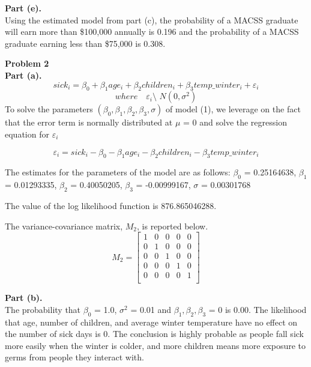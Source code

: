 \documentclass[letterpaper,12pt]{article}
\theoremstyle{definition}
\begin{document}
\textbf{Part (e).} \\
\flushleft Using the estimated model from part (c), the probability of a MACSS graduate will earn more than \$100,000 annually is 0.196 and the probability of a MACSS graduate earning less than \$75,000 is 0.308. 

\flushleft


\newpage
\noindent\textbf{Problem 2}\\
\textbf{Part (a).} \\
\flushleft 
\begin{equation}
sick_{i}=\beta_0+\beta_1age_{i}+\beta_2children_i+\beta_3temp\_winter_{i}+\varepsilon_{i}
\end{equation}
\begin{equation}
where\quad \varepsilon_i \texttt{\char`\~} N(0, \sigma^2)\nonumber
\end{equation}
To solve the parameters $(\beta_0, \beta_1, \beta_2, \beta_3, \sigma)$ of model (1), we leverage on the fact that the error term is normally distributed at $\mu$ = 0 and solve the regression equation for $\varepsilon_i$

\begin{equation}
\varepsilon_{i}= sick_i - \beta_0 - \beta_1age_{i}-\beta_2children_i-\beta_3temp\_winter_{i}
\end{equation}

The estimates for the parameters of the model are as follows: 
$\beta_0$ = 0.25164638, $\beta_1$ = 0.01293335, $\beta_2$ = 0.40050205, $\beta_3$ = -0.00999167,  $\sigma$ = 0.00301768

\flushleft 
The value of the log likelihood function is 876.865046288.

\flushleft 
The variance-covariance matrix, $M_2$, is reported below. 
\[
M_2 =
  \begin{bmatrix}
1 &  0&  0&  0&  0\\
0 &  1&  0&  0&  0\\
0 &  0&  1&  0&  0\\
0 &  0&  0&  1&  0\\
0 &  0&  0&  0&  1\\
\end{bmatrix}
\]


\textbf{Part (b).} \\
\flushleft 
The probability that $\beta_0$ = 1.0, $\sigma^2$ = 0.01 and $\beta_1, \beta_2, \beta_3$ = 0 is 0.00. The likelihood that age, number of children, and average winter temperature have no effect on the number of sick days is 0. The conclusion is highly probable as people fall sick more easily when the winter is colder, and more children means more exposure to germs from people they interact with.  
\end{document}
